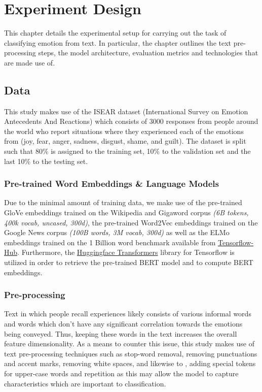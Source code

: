 \chapter{Experiment Design}\label{ch:Requirements Analysis}

This chapter details the experimental setup for carrying out the task of classifying emotion from text. In particular, the chapter outlines the text pre-processing steps, the model architecture, evaluation metrics and technologies that are made use of.

\section{Data}

This study makes use of the ISEAR dataset (International Survey on Emotion Antecedents And Reactions) which consists of 3000 responses from people around the world who report situations where they experienced each of the emotions from (joy, fear, anger, sadness, disgust, shame, and guilt). The dataset is split such that 80\% is assigned to the training set, 10\% to the validation set and the last 10\% to the testing set. 

\subsection{Pre-trained Word Embeddings \& Language Models}

Due to the minimal amount of training data, we make use of the pre-trained GloVe embeddings trained on the Wikipedia and Gigaword corpus \textit{(6B tokens, 400k vocab, uncased, 300d)}, the pre-trained Word2Vec embeddings trained on the Google News corpus \textit{(100B words, 3M vocab, 300d)} as well as the ELMo embeddings trained on the 1 Billion word benchmark available from \href{https://tfhub.dev/}{Tensorflow-Hub}. Furthermore, the \href{https://github.com/huggingface/transformers}{Huggingface Transformers} library for Tensorflow is utilized in order to retrieve the pre-trained BERT model and to compute BERT embeddings. 

\subsection{Pre-processing}

Text in which people recall experiences likely consists of various informal words and words which don't have any significant correlation towards the emotions being conveyed. Thus, keeping these words in the text increases the overall feature dimensionality. As a means to counter this issue, this study makes use of text pre-processing techniques such as stop-word removal, removing punctuations and accent marks, removing white spaces, and likewise to \citep{DBLP:journals/corr/abs-1801-06146}, adding special tokens for upper-case words and repetition as this may allow the model to capture characteristics which are important to classification.

